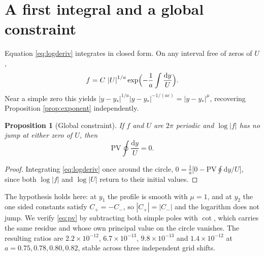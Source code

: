 \documentclass[11pt]{article}
\newtheorem{proposition}{Proposition}
\theoremstyle{definition}
\newcommand{\abs}[1]{\left\lvert #1 \right\rvert}
\begin{document}
\section{A first integral and a global constraint}
\label{sec:integral}

Equation \eqref{eq:logderiv} integrates in closed form. On any interval free of
zeros of $U$,
\begin{equation}
  f = C\,\abs{U}^{1/a}\exp\Bigl(-\frac1a\int \frac{\mathrm{d}y}{U}\Bigr).
  \label{eq:firstintegral}
\end{equation}
Near a simple zero this yields
$\abs{y-y_\ast}^{1/a}\abs{y-y_\ast}^{-1/(ac)} = \abs{y-y_\ast}^{\mu}$,
recovering Proposition \ref{prop:exponent} independently.

\begin{proposition}[Global constraint]
\label{prop:pv}
If $f$ and $U$ are $2\pi$ periodic and $\log\abs{f}$ has no jump at either
zero of $U$, then
\begin{equation}
  \mathrm{PV}\oint \frac{\mathrm{d}y}{U} = 0.
  \label{eq:pv}
\end{equation}
\end{proposition}

\begin{proof}
Integrating \eqref{eq:logderiv} once around the circle,
$0 = \frac1a\bigl[0 - \mathrm{PV}\oint \mathrm{d}y/U\bigr]$, since both
$\log\abs{f}$ and $\log\abs{U}$ return to their initial values.
\end{proof}

The hypothesis holds here: at $y_1$ the profile is smooth with $\mu=1$, and at
$y_2$ the one sided constants satisfy $C_+=-C_-$, so $\abs{C_+}=\abs{C_-}$ and
the logarithm does not jump. We verify \eqref{eq:pv} by subtracting both simple
poles with $\cot$, which carries the same residue and whose own principal value
on the circle vanishes. The resulting ratios are $2.2\times10^{-12}$,
$6.7\times10^{-13}$, $9.8\times10^{-13}$ and $1.4\times10^{-12}$ at
$a=0.75,0.78,0.80,0.82$, stable across three independent grid shifts.
\end{document}
